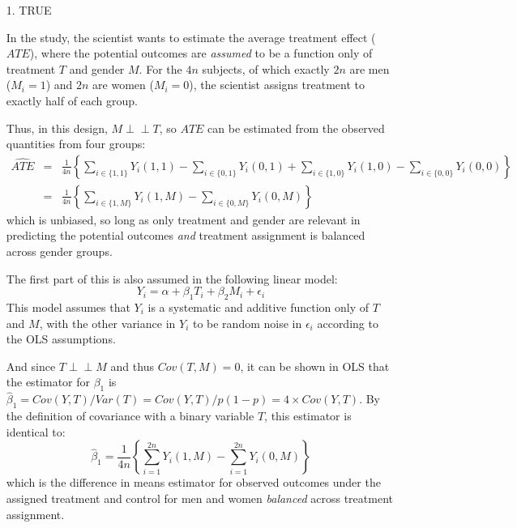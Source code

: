 \documentclass{article}
\newcommand{\indep}{\perp\!\!\!\perp}
\begin{document}
\begin{itemize}



\item[1.]  TRUE
\vspace{1em}

In the study, the scientist wants to estimate the average treatment
effect ($ATE$), where the potential outcomes are {\em assumed} to be a
function only of treatment $T$ and gender $M$.  
For the $4n$ subjects, of which exactly $2n$ are men ($M_i=1$) and $2n$ are
women ($M_i=0$), the scientist assigns treatment to exactly half of each
group.  


Thus, in this design, $M\indep T$, so ${ATE}$ can be estimated from
the observed quantities from four groups:
\begin{eqnarray}  
\nonumber       \widehat{ ATE } & = & \frac{1}{4n}\left\{\sum_{i\in\{1,1\}}Y_i(1,1) - \sum_{i\in\{0,1\}}
  Y_i(0,1) + \sum_{i\in\{1,0\}}Y_i(1,0) - \sum_{i\in\{0,0\}}
  Y_i(0,0)\right\} \\
\nonumber   &=& \frac{1}{4n}\left\{\sum_{i\in\{1,M\}}Y_i(1,M) - \sum_{i\in\{0,M\}}
  Y_i(0,M)\right\} 
\end{eqnarray}
which is unbiased, so long as only treatment and gender are relevant in predicting the
potential outcomes {\em and} treatment assignment is balanced across
gender groups.  

The first part of this is also assumed in the following linear model: 
      $$
        Y_i = \alpha + \beta_1 T_i + \beta_2 M_i + \epsilon_i
      $$
      This model assumes that $Y_i$ is a systematic and additive
      function only of $T$ and $M$, with the other variance in $Y_i$
      to be random noise in $\epsilon_i$ according to the OLS
      assumptions.  

      And since $T\indep M$ and thus $Cov(T,M)=0$,  it can be shown in OLS that the estimator
      for $\beta_1$ is
      $\hat{\beta}_1=Cov(Y,T)/Var(T)=Cov(Y,T)/p(1-p)=4\times Cov(Y,T)$.
      By the definition of covariance with a binary variable $T$, this
      estimator is identical to:
$$
\hat{\beta}_1 =  \frac{1}{4n}\left\{\sum_{i=1}^{2n}Y_i(1,M) -
         \sum_{i=1}^{2n} Y_i(0,M)\right\} 
$$
which is the difference in means estimator for observed outcomes under
the assigned treatment and control for men and women {\em balanced} across
treatment assignment.


\end{itemize}
\end{document}
